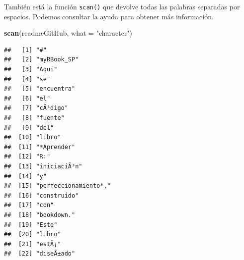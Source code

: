 \documentclass[
]{book}
\newenvironment{Shaded}{\begin{snugshade}}{\end{snugshade}}
\newcommand{\DataTypeTok}[1]{\textcolor[rgb]{0.13,0.29,0.53}{#1}}
\newcommand{\KeywordTok}[1]{\textcolor[rgb]{0.13,0.29,0.53}{\textbf{#1}}}
\newcommand{\NormalTok}[1]{#1}
\newcommand{\StringTok}[1]{\textcolor[rgb]{0.31,0.60,0.02}{#1}}
\begin{document}
También está la función \texttt{scan()} que devolve todas las palabras separadas por espacios. Podemos consultar la ayuda para obtener más información.

\begin{Shaded}
\begin{Highlighting}[]
\KeywordTok{scan}\NormalTok{(readmeGitHub, }\DataTypeTok{what =} \StringTok{"character"}\NormalTok{)}
\end{Highlighting}
\end{Shaded}

\begin{verbatim}
##   [1] "#"                                                                                
##   [2] "myRBook_SP"                                                                       
##   [3] "Aqui"                                                                             
##   [4] "se"                                                                               
##   [5] "encuentra"                                                                        
##   [6] "el"                                                                               
##   [7] "cÃ³digo"                                                                          
##   [8] "fuente"                                                                           
##   [9] "del"                                                                              
##  [10] "libro"                                                                            
##  [11] "*Aprender"                                                                        
##  [12] "R:"                                                                               
##  [13] "iniciaciÃ³n"                                                                      
##  [14] "y"                                                                                
##  [15] "perfeccionamiento*,"                                                              
##  [16] "construido"                                                                       
##  [17] "con"                                                                              
##  [18] "bookdown."                                                                        
##  [19] "Este"                                                                             
##  [20] "libro"                                                                            
##  [21] "estÃ¡"                                                                            
##  [22] "diseÃ±ado"                                                                        

\end{verbatim}
\end{document}
